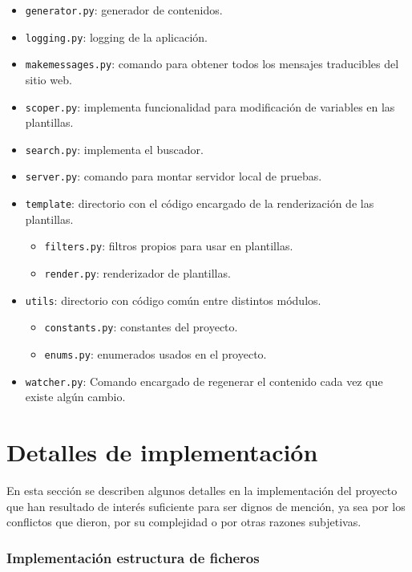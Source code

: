 \begin{itemize}
\item \texttt{generator.py}: generador de contenidos.
\item \texttt{logging.py}: logging de la aplicación.
\item \texttt{makemessages.py}: comando para obtener todos los mensajes traducibles del sitio web.
\item \texttt{scoper.py}: implementa funcionalidad para modificación de variables en las plantillas.
\item \texttt{search.py}: implementa el buscador.
\item \texttt{server.py}: comando para montar servidor local de pruebas.
\item \texttt{template}: directorio con el código encargado de la renderización de las plantillas.
    \begin{itemize}
        \item \texttt{filters.py}: filtros propios para usar en plantillas.
       \item \texttt{render.py}: renderizador de plantillas.
    \end{itemize}

\item \texttt{utils}: directorio con código común entre distintos módulos.
    \begin{itemize}
        \item \texttt{constants.py}: constantes del proyecto.
       \item \texttt{enums.py}: enumerados usados en el proyecto.
    \end{itemize}

\item \texttt{watcher.py}: Comando encargado de regenerar el contenido cada vez que existe algún cambio.
\end{itemize}


\section{Detalles de implementación}

En esta sección se describen algunos detalles en la implementación del proyecto
que han resultado de interés suficiente para ser dignos de mención, ya sea por los
conflictos que dieron, por su complejidad o por otras razones subjetivas.

\subsubsection{Implementación estructura de ficheros}

